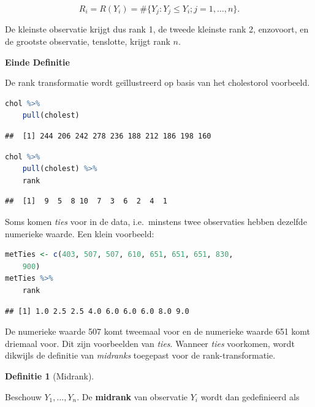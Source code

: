 \documentclass[
  12pt,dutch,coursenotes]{book}
\theoremstyle{definition}
\newtheorem{definition}{Definitie}[chapter]
\theoremstyle{definition}
\theoremstyle{definition}
\theoremstyle{definition}
\theoremstyle{remark}
\begin{document}
\begin{equation*}
  R_i=R(Y_i) = \#\{Y_j: Y_j\leq Y_i; j=1,\ldots, n\}.
\end{equation*}

De kleinste observatie krijgt dus rank 1, de tweede kleinste rank 2, enzovoort, en de grootste observatie,
tenslotte, krijgt rank \(n\).

\textbf{Einde Definitie}

De rank transformatie wordt geïllustreerd op basis van het cholestorol voorbeeld.

\begin{lstlisting}[language=R]
chol %>%
    pull(cholest)
\end{lstlisting}

\begin{lstlisting}
##  [1] 244 206 242 278 236 188 212 186 198 160
\end{lstlisting}

\begin{lstlisting}[language=R]
chol %>%
    pull(cholest) %>%
    rank
\end{lstlisting}

\begin{lstlisting}
##  [1]  9  5  8 10  7  3  6  2  4  1
\end{lstlisting}

Soms komen \emph{ties} voor in de data, i.e.~minstens twee observaties hebben dezelfde numerieke waarde. Een klein voorbeeld:

\begin{lstlisting}[language=R]
metTies <- c(403, 507, 507, 610, 651, 651, 651, 830,
    900)
metTies %>%
    rank
\end{lstlisting}

\begin{lstlisting}
## [1] 1.0 2.5 2.5 4.0 6.0 6.0 6.0 8.0 9.0
\end{lstlisting}

De numerieke waarde 507 komt tweemaal voor en de numerieke waarde 651 komt driemaal voor. Dit zijn voorbeelden van \emph{ties}.
Wanneer \emph{ties} voorkomen, wordt dikwijls de definitie van \emph{midranks} toegepast voor de rank-transformatie.

\begin{definition}[Midrank]
\protect\hypertarget{def:unnamed-chunk-210}{}{\label{def:unnamed-chunk-210} {} }
\end{definition}
Beschouw \(Y_1, \ldots, Y_n\).
De \textbf{midrank} van observatie \(Y_i\) wordt dan
gedefinieerd als
\end{document}
